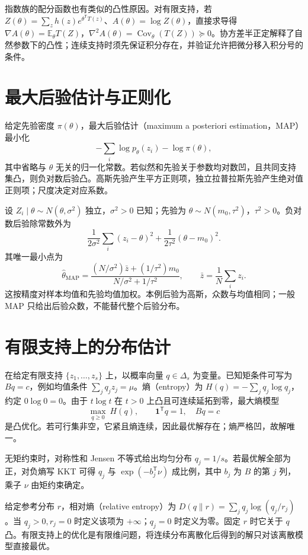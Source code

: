\documentclass[UTF8,12pt,a4paper,fontset=fandol]{ctexbook}
\begin{document}
指数族的配分函数也有类似的凸性原因。对有限支持，若 $Z(\theta)=\sum_z h(z)e^{\theta^{\mathsf T}T(z)}$、$A(\theta)=\log Z(\theta)$，直接求导得 $\nabla A(\theta)=\mathbb E_\theta T(Z)$，$\nabla^2 A(\theta)=\operatorname{Cov}_\theta(T(Z))\succeq0$。协方差半正定解释了自然参数下的凸性；连续支持时须先保证积分存在，并验证允许把微分移入积分号的条件。

\section{最大后验估计与正则化}

给定先验密度 $\pi(\theta)$，最大后验估计（maximum a posteriori estimation，MAP）最小化
\[
 -\sum_i\log p_\theta(z_i)-\log\pi(\theta),
\]
其中省略与 $\theta$ 无关的归一化常数。若似然和先验关于参数均对数凹，且共同支持集凸，则负对数后验凸。高斯先验产生平方正则项，独立拉普拉斯先验产生绝对值正则项；尺度决定对应系数。

\begin{example}
设 $Z_i\mid\theta\sim N(\theta,\sigma^2)$ 独立，$\sigma^2>0$ 已知；先验为 $\theta\sim N(m_0,\tau^2)$，$\tau^2>0$。负对数后验除常数外为
\[
 \frac1{2\sigma^2}\sum_i(z_i-\theta)^2+\frac1{2\tau^2}(\theta-m_0)^2.
\]
其唯一最小点为
\[
 \widehat\theta_{\mathrm{MAP}}
 =\frac{(N/\sigma^2)\bar z+(1/\tau^2)m_0}{N/\sigma^2+1/\tau^2},
 \qquad \bar z=\frac1N\sum_i z_i.
\]
这按精度对样本均值和先验均值加权。本例后验为高斯，众数与均值相同；一般 MAP 只给出后验众数，不能替代整个后验分布。
\end{example}

\section{有限支持上的分布估计}

在给定有限支持 $\{z_1,\ldots,z_s\}$ 上，以概率向量 $q\in\Delta_s$ 为变量。已知矩条件可写为 $Bq=c$，例如均值条件 $\sum_jq_jz_j=\mu$。熵（entropy）为 $H(q)=-\sum_jq_j\log q_j$，约定 $0\log0=0$。由于 $t\log t$ 在 $t>0$ 上凸且可连续延拓到零，最大熵模型
\[
 \max_{q\geq0}\ H(q),\qquad \mathbf1^{\mathsf T}q=1,\quad Bq=c
\]
是凸优化。若可行集非空，它紧且熵连续，因此最优解存在；熵严格凹，故解唯一。

无矩约束时，对称性和 Jensen 不等式给出均匀分布 $q_j=1/s$。若最优解全部为正，对负熵写 KKT 可得 $q_j$ 与 $\exp(-b_j^{\mathsf T}\nu)$ 成比例，其中 $b_j$ 为 $B$ 的第 $j$ 列，乘子 $\nu$ 由矩约束确定。

给定参考分布 $r$，相对熵（relative entropy）为 $D(q\|r)=\sum_jq_j\log(q_j/r_j)$。当 $q_j>0,r_j=0$ 时定义该项为 $+\infty$；$q_j=0$ 时定义为零。固定 $r$ 时它关于 $q$ 凸。有限支持上的优化是有限维问题，将连续分布离散化后得到的解只对该离散模型直接最优。
\end{document}
